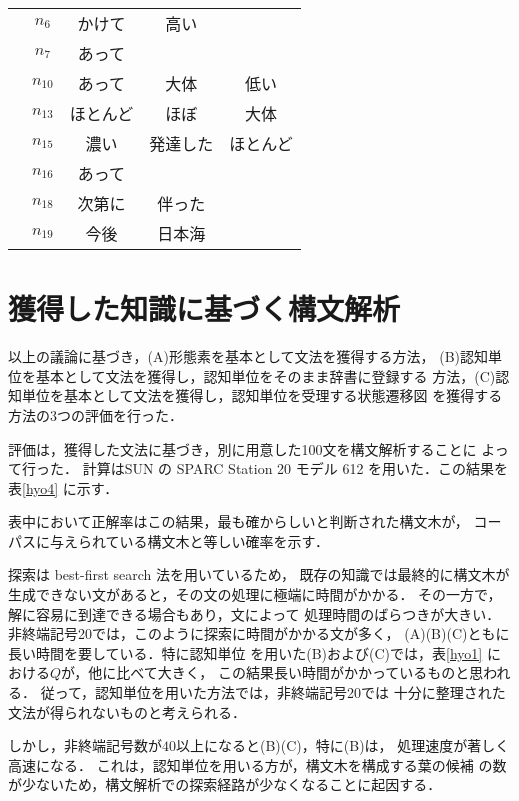\begin{table}[htb]
\begin{center}
\begin{tabular}{c|c|ccc}
 & $n_6$ & かけて& 高い \\ 
 & $n_7$ & あって \\  
 & $n_{10}$ & あって & 大体 & 低い \\ 
 & $n_{13}$ & ほとんど & ほぼ & 大体 \\ 
 & $n_{15}$ & 濃い & 発達した & ほとんど \\ 
 & $n_{16}$ & あって \\  
 & $n_{18}$ & 次第に & 伴った \\ 
 & $n_{19}$ & 今後 & 日本海 \\  \hline \hline 
\end{tabular}
\end{center}
\end{table}

\section{獲得した知識に基づく構文解析}

以上の議論に基づき，(A)形態素を基本として文法を獲得する方法，
(B)認知単位を基本として文法を獲得し，認知単位をそのまま辞書に登録する
方法，(C)認知単位を基本として文法を獲得し，認知単位を受理する状態遷移図
を獲得する方法の3つの評価を行った．



評価は，獲得した文法に基づき，別に用意した100文を構文解析することに
よって行った．
計算はSUN の SPARC Station 20 モデル
612 を用いた．この結果を表\ref{hyo4} に示す．

表中において正解率はこの結果，最も確からしいと判断された構文木が，
コーパスに与えられている構文木と等しい確率を示す．

探索は best-first search 法を用いているため，
既存の知識では最終的に構文木が
生成できない文があると，その文の処理に極端に時間がかかる．
その一方で，解に容易に到達できる場合もあり，文によって
処理時間のばらつきが大きい．
非終端記号20では，このように探索に時間がかかる文が多く，
(A)(B)(C)ともに長い時間を要している．特に認知単位
を用いた(B)および(C)では，表\ref{hyo1}
における$Q$が，他に比べて大きく，
この結果長い時間がかかっているものと思われる．
従って，認知単位を用いた方法では，非終端記号20では
十分に整理された文法が得られないものと考えられる．

しかし，非終端記号数が$40$以上になると(B)(C)，特に(B)は，
処理速度が著しく高速になる．
これは，認知単位を用いる方が，構文木を構成する葉の候補
の数が少ないため，構文解析での探索経路が少なくなることに起因する．


